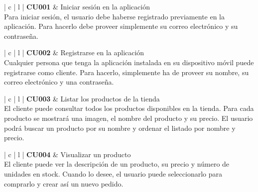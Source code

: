 \documentclass[11pt,spanish,listoffigures]{tfgetsinf}
\begin{document}
\begin{center}
\begin{tabular}{ | c | l | }
\hline
\textbf{ CU001 } & Iniciar sesión en la aplicación \\
\hline
{}
{
Para iniciar sesión, el usuario debe haberse registrado previamente en la aplicación. Para hacerlo debe proveer simplemente su correo electrónico y su contraseña.
} \\
\hline
\end{tabular}
\end{center}

\begin{center}
\begin{tabular}{ | c | l | }
\hline
\textbf{ CU002 } & Registrarse en la aplicación \\
\hline
{}
{
Cualquier persona que tenga la aplicación instalada en su dispositivo móvil puede registrarse como cliente. Para hacerlo, simplemente ha de proveer su nombre, su correo electrónico y una contraseña.
} \\
\hline
\end{tabular}
\end{center}

\begin{center}
\begin{tabular}{ | c | l | }
\hline
\textbf{ CU003 } & Listar los productos de la tienda \\
\hline
{}
{
El cliente puede consultar todos los productos disponibles en la tienda. Para cada producto se mostrará una imagen, el nombre del producto y su precio. El usuario podrá buscar un producto por su nombre y ordenar el listado por nombre y precio.
} \\
\hline
\end{tabular}
\end{center}

\begin{center}
\begin{tabular}{ | c | l | }
\hline
\textbf{ CU004 } & Visualizar un producto \\
\hline
{}
{
El cliente puede ver la descripción de un producto, su precio y número de unidades en stock. Cuando lo desee, el usuario puede seleccionarlo para comprarlo y crear así un nuevo pedido.
} \\
\hline
\end{tabular}
\end{center}
\end{document}
